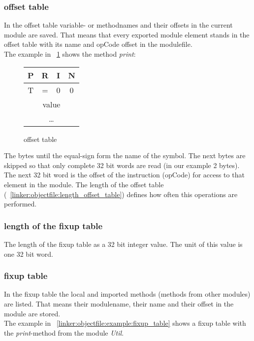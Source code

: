 \subsubsection{offset table}
\label{linker:objectfile:offset_table}
In the offset table variable- or methodnames and their offsets in the current
module are saved. That means that every exported module element stands in the
offset table with its name and opCode offset in the modulefile.  \\
The example in ~\ref{linker:objectfile:example:offset_table} shows the method
\emph{print}:

\begin{figure}[h]
	\begin{center}
		\begin{tabular}{|c|c|c|c|}
			\hline
			P &  R & I & N \\
			\hline
			T &  = &  0 & 0 \\
			\hline 
			\multicolumn{4}{|c|}{value} \\
			\hline
			\multicolumn{4}{|c|}{\ldots} \\
			\hline
		\end{tabular}
	\end{center}
	\caption{offset table}
	\label{linker:objectfile:example:offset_table}
\end{figure}

The bytes until the equal-sign form the name of the symbol. The next bytes
are skipped so that only complete 32 bit words are read (in our example 2 bytes). 
The next 32 bit word is the offset of the instruction (opCode) for access to that 
element in the module. The length of the offset table (~\ref{linker:objectfile:length_offset_table})  
defines how often this operations are performed. 

\subsubsection{length of the fixup table}
\label{linker:objectfile:length_fixup_table}
The length of the fixup table as a 32 bit integer value. The unit of this value
is one 32 bit word. 
\subsubsection{fixup table}
\label{linker:objectfile:fixup_table}
In the fixup table the local and imported methods (methods from other modules) are
listed. That means their modulename, their name and their offset in the module are stored. \\
The example in ~\ref{linker:objectfile:example:fixup_table} shows a fixup table
with the \emph{print}-method from the module \emph{Util}.

